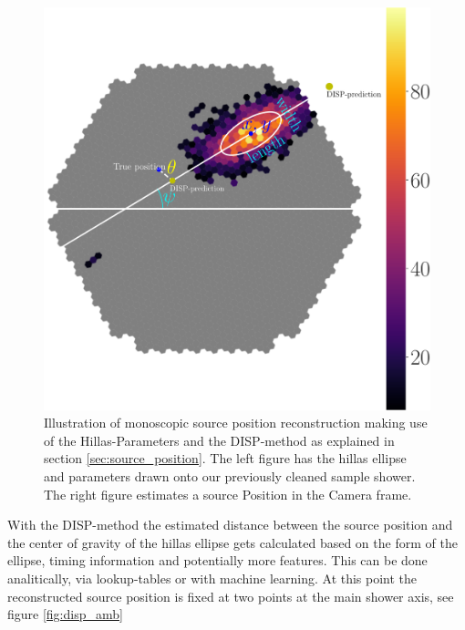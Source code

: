 \begin{figure}
    \includegraphics[width=0.9\linewidth]{../Plots/hillas_complete.pdf}
    \caption{Illustration of monoscopic source position reconstruction making use of 
        the Hillas-Parameters and the DISP-method as explained in section \ref{sec:source_position}.
        The left figure has the hillas ellipse and parameters drawn onto our previously cleaned sample shower.
        The right figure estimates a source Position in the Camera frame.}
    \label{fig:disp}
\end{figure}

With the DISP-method the estimated distance between the source
position and the center of gravity of the hillas ellipse gets calculated
based on the form of the ellipse, timing information and potentially
more features.
This can be done analitically, via lookup-tables or with machine learning.
At this point the reconstructed source position
is fixed at two points at the main shower axis, see figure \ref{fig:disp_amb}


